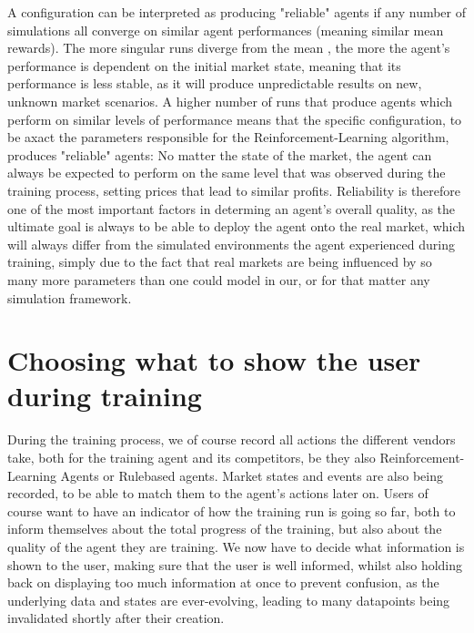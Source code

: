  A configuration can be interpreted as producing "reliable" agents if any number of simulations all converge on similar agent performances (meaning similar mean rewards). The more singular runs diverge from the mean , the more the agent's performance is dependent on the initial market state, meaning that its performance is less stable, as it will produce unpredictable results on new, unknown market scenarios. A higher number of runs that produce agents which perform on similar levels of performance means that the specific configuration, to be axact the parameters responsible for the Reinforcement-Learning algorithm, produces "reliable" agents: No matter the state of the market, the agent can always be expected to perform on the same level that was observed during the training process, setting prices that lead to similar profits. Reliability is therefore one of the most important factors in determing an agent's overall quality, as the ultimate goal is always to be able to deploy the agent onto the real market, which will always differ from the simulated environments the agent experienced during training, simply due to the fact that real markets are being influenced by so many more parameters than one could model in our, or for that matter any simulation framework. 

\section{Choosing what to show the user during training}

During the training process, we of course record all actions the different vendors take, both for the training agent and its competitors, be they also Reinforcement-Learning Agents or Rulebased agents. Market states and events are also being recorded, to be able to match them to the agent's actions later on. Users of course want to have an indicator of how the training run is going so far, both to inform themselves about the total progress of the training, but also about the quality of the agent they are training. We now have to decide what information is shown to the user, making sure that the user is well informed, whilst also holding back on displaying too much information at once to prevent confusion, as the underlying data and states are ever-evolving, leading to many datapoints being invalidated shortly after their creation.

